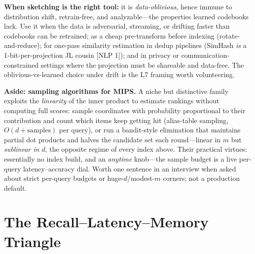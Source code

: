 \textbf{When sketching is the right tool:} it is \emph{data-oblivious}, hence immune to distribution shift, retrain-free, and analyzable---the properties learned codebooks lack. Use it when the data is adversarial, streaming, or drifting faster than codebooks can be retrained; as a cheap pre-transform before indexing (rotate-and-reduce); for one-pass similarity estimation in dedup pipelines (SimHash \emph{is} a 1-bit-per-projection JL cousin [NLP 1]); and in privacy or communication-constrained settings where the projection must be shareable and data-free. The oblivious-vs-learned choice under drift is the L7 framing worth volunteering.

\textbf{Aside: sampling algorithms for MIPS.} A niche but distinctive family exploits the \emph{linearity} of the inner product to estimate rankings without computing full scores: sample coordinates with probability proportional to their contribution and count which items keep getting hit (alias-table sampling, $O(d + \text{samples})$ per query), or run a bandit-style elimination that maintains partial dot products and halves the candidate set each round---linear in $m$ but \emph{sublinear in $d$}, the opposite regime of every index above. Their practical virtues: essentially no index build, and an \emph{anytime} knob---the sample budget is a live per-query latency--accuracy dial. Worth one sentence in an interview when asked about strict per-query budgets or huge-$d$/modest-$m$ corners; not a production default.

\section{The Recall--Latency--Memory Triangle}
\label{sr:sec:vr_triangle}

